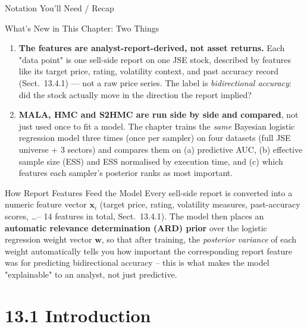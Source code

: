 \documentclass[aspectratio=169,10pt]{beamer}
\newcommand{\w}{\mathbf{w}}
\newcommand{\x}{\mathbf{x}}
\begin{document}
\begin{frame}[allowframebreaks]{Notation You'll Need / Recap}
\framebreak

\begin{alertblock}{What's New in This Chapter: Two Things}
\begin{enumerate}
  \item \textbf{The features are analyst-report-derived, not asset returns.}
        Each "data point" is one sell-side report on one JSE stock, described
        by features like its target price, rating, volatility context, and
        past accuracy record (Sect.~13.4.1) --- not a raw price series. The
        label is \emph{bidirectional accuracy}: did the stock actually move
        in the direction the report implied?
  \item \textbf{MALA, HMC and S2HMC are run side by side and compared}, not
        just used once to fit a model. The chapter trains the \emph{same}
        Bayesian logistic regression model three times (once per sampler) on
        four datasets (full JSE universe + 3 sectors) and compares them on
        (a) predictive AUC, (b) effective sample size (ESS) and ESS
        normalised by execution time, and (c) which features each sampler's
        posterior ranks as most important.
\end{enumerate}
\end{alertblock}

\begin{block}{How Report Features Feed the Model}
Every sell-side report is converted into a numeric feature vector $\x_i$
(target price, rating, volatility measures, past-accuracy scores, \ldots --
14 features in total, Sect.~13.4.1). The model then places an
\textbf{automatic relevance determination (ARD) prior} over the logistic
regression weight vector $\w$, so that after training, the \emph{posterior
variance} of each weight automatically tells you how important the
corresponding report feature was for predicting bidirectional accuracy --
this is what makes the model "explainable" to an analyst, not just
predictive.
\end{block}

\end{frame}

\section{13.1 Introduction}
\end{document}
